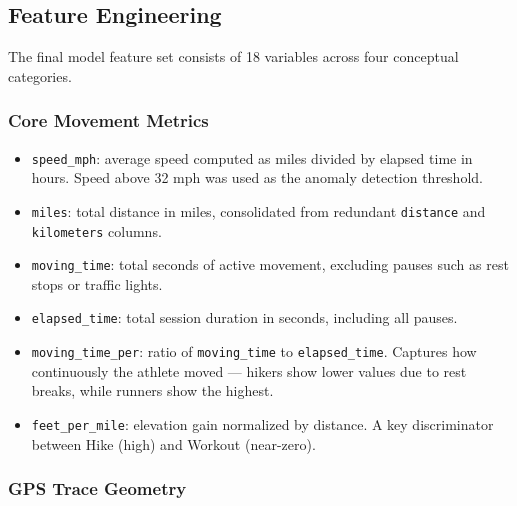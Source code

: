 \documentclass[11pt, onecolumn]{article}
\begin{document}
\subsection{Feature Engineering}

The final model feature set consists of 18 variables across four conceptual categories.

\subsubsection{Core Movement Metrics}

\begin{itemize}
    \item \texttt{speed\_mph}: average speed computed as miles divided by elapsed time in 
    hours. Speed above 32 mph was used as the anomaly detection threshold.
    
    \item \texttt{miles}: total distance in miles, consolidated from redundant 
    \texttt{distance} and \texttt{kilometers} columns.
    
    \item \texttt{moving\_time}: total seconds of active movement, excluding pauses 
    such as rest stops or traffic lights.
    
    \item \texttt{elapsed\_time}: total session duration in seconds, including all pauses.
    
    \item \texttt{moving\_time\_per}: ratio of \texttt{moving\_time} to 
    \texttt{elapsed\_time}. Captures how continuously the athlete moved --- hikers 
    show lower values due to rest breaks, while runners show the highest.
    
    \item \texttt{feet\_per\_mile}: elevation gain normalized by distance. A key 
    discriminator between Hike (high) and Workout (near-zero).
\end{itemize}

\subsubsection{GPS Trace Geometry}
\end{document}
